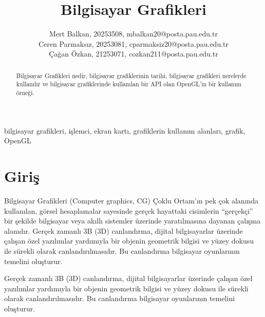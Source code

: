 \documentclass{IEEEtran}
\begin{document}
\title{Bilgisayar Grafikleri}%
\author{Mert Balkan, 20253508, mbalkan20@posta.pau.edu.tr \\ Ceren Parmaksız, 20253081, cparmaksiz20@posta.pau.edu.tr \\ Çağan Özkan, 21253071, cozkan211@posta.pau.edu.tr} %



\maketitle

\begin{abstract}
Bilgisayar Grafikleri nedir, bilgisayar grafiklerinin tarihi, bilgisayar grafikleri nerelerde kullanılır ve bilgisayar grafiklerinde kullanılan bir API olan OpenGL'in bir kullanım örneği.
\end{abstract}

\begin{IEEEkeywords}%
bilgisayar grafikleri, işlemci, ekran kartı, grafiklerin kullanım alanları, grafik, OpenGL
\end{IEEEkeywords}

\section{Giriş}
\label{sec:giris}

Bilgisayar Grafikleri (Computer graphics, CG) Çoklu Ortam’ın pek çok alanında kullanılan, görsel hesaplamalar sayesinde gerçek hayattaki cisimlerin “gerçekçi” bir şekilde bilgisayar veya akıllı sistemler üzerinde yaratılmasına dayanan çalışma alanıdır.
Gerçek zamanlı 3B (3D) canlandırma, dijital bilgisayarlar üzerinde çalışan özel yazılımlar yardımıyla bir objenin geometrik bilgisi ve yüzey dokusu ile sürekli olarak canlandırılmasıdır. Bu canlandırma bilgisayar oyunlarının temelini oluşturur.

Gerçek zamanlı 3B (3D) canlandırma, dijital bilgisayarlar üzerinde çalışan özel yazılımlar yardımıyla bir objenin geometrik bilgisi ve yüzey dokusu ile sürekli olarak canlandırılmasıdır. Bu canlandırma bilgisayar oyunlarının temelini oluşturur. 
\end{document}
